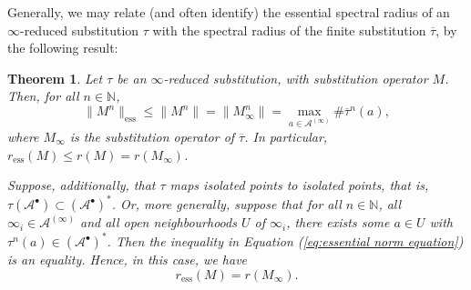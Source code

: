 \documentclass[11pt]{amsart}
\numberwithin{equation}{section}
\theoremstyle{plain}
\newtheorem{theorem}{Theorem}[section]
\theoremstyle{definition}
\newcommand{\N}{{\mathbb N}}
\newcommand{\mc}{\mathcal}
\newcommand{\A}{\mc A}
\begin{document}
Generally, we may relate (and often identify) the essential spectral radius of an \(\infty\)-reduced substitution \(\tau\) with the spectral radius of the finite substitution \(\overline{\tau}\), by the following result:

\begin{theorem} \label{thm:spectral radius of reduction}
Let \(\tau\) be an \(\infty\)-reduced substitution, with substitution operator \(M\). Then, for all \(n \in \N\),
\begin{equation} \label{eq:essential norm equation}
\| M^n \|_\mathrm{ess} \leq \| M^n \| = \| M_\infty^n \| = \max_{a \in \A^{(\infty)}} \# \overline{\tau}^n(a) ,
\end{equation}
where \(M_\infty\) is the substitution operator of \(\overline{\tau}\). In particular, \(r_\mathrm{ess}(M) \leq r(M) = r(M_\infty)\).

Suppose, additionally, that \(\tau\) maps isolated points to isolated points, that is, \(\tau(\A^\bullet) \subset (\A^\bullet)^\ast\). Or, more generally, suppose that for all \(n \in \N\), all \(\infty_i \in \A^{(\infty)}\) and all open neighbourhoods \(U\) of \(\infty_i\), there exists some \(a \in U\) with \(\tau^n(a) \in (\A^\bullet)^\ast\). Then the inequality in Equation (\ref{eq:essential norm equation}) is an equality. Hence, in this case, we have
\[
r_\mathrm{ess}(M) = r(M_\infty) .
\]
\end{theorem}
\end{document}
